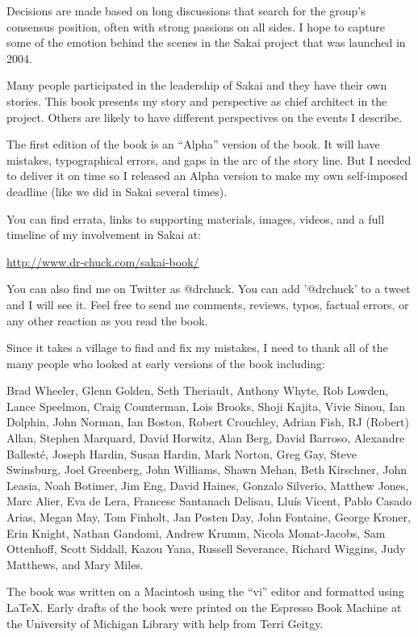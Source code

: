 \documentclass[12pt]{book}
\begin{document}
Decisions are made based on long discussions that search
for the group's consensus position, often with strong
passions on all sides. I hope to capture
some of the emotion behind the scenes in the Sakai project
that was launched in 2004.

Many people participated in the leadership of Sakai and they
have their own stories.  This book presents my story and perspective
as chief architect in the project.  Others
are likely to have different perspectives on the events
I describe.

The first edition of the book is an ``Alpha'' version of the
book.  It will have mistakes, typographical errors, and gaps
in the arc of the story line.  But I needed to deliver it
on time so I released an Alpha version to make
my own self-imposed
deadline (like we did in Sakai several times).

You can find errata, links to supporting materials, images,
videos, and a full timeline of my involvement in Sakai at:

\url{http://www.dr-chuck.com/sakai-book/}

You can also find me on Twitter as @drchuck.  You can
add '@drchuck' to a tweet and I will see it.  Feel free
to send me comments, reviews, typos, factual errors, or
any other reaction as you read the book.

Since it takes a village to find and fix my mistakes, I
need to thank all of the many people who looked at early versions
of the book including:

Brad Wheeler, Glenn Golden, Seth Theriault, Anthony Whyte, Rob Lowden, Lance Speelmon, Craig Counterman, Lois Brooks, Shoji Kajita, Vivie Sinou, Ian Dolphin, John Norman, Ian Boston, Robert Crouchley, Adrian Fish, RJ (Robert) Allan, Stephen Marquard, David Horwitz, Alan Berg, David Barroso, Alexandre Ballest\'e, Joseph Hardin, Susan Hardin, Mark Norton, Greg Gay, Steve Swinsburg, Joel Greenberg, John Williams, Shawn Mehan, Beth Kirschner, John Leasia, Noah Botimer, Jim Eng, David Haines, Gonzalo Silverio, Matthew Jones, Marc Alier, Eva de Lera, Francesc Santanach Delisau, Llu\'is Vicent, Pablo Casado Arias, Megan May, Tom Finholt, Jan Posten Day, John Fontaine, George Kroner, Erin Knight, Nathan Gandomi, Andrew Krumm, Nicola Monat-Jacobs, Sam Ottenhoff, Scott Siddall, Kazou Yana, Russell Severance, Richard Wiggins, Judy Matthews, and Mary Miles.

The book was written on a Macintosh using the ``vi'' editor and
formatted using LaTeX.  Early drafts of the book were printed
on the Espresso Book Machine at the University of Michigan Library
with help from Terri Geitgy.
\end{document}
